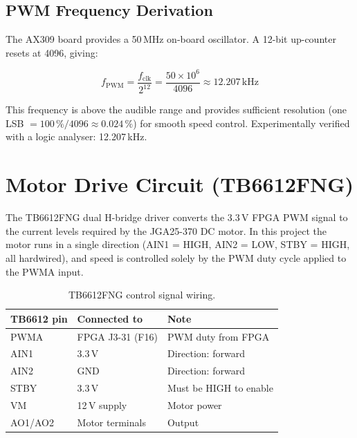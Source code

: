 \documentclass[12pt, a4paper]{report}
\begin{document}
\subsection{PWM Frequency Derivation}

The AX309 board provides a 50\,MHz on-board oscillator. A 12-bit up-counter
resets at 4096, giving:

\begin{equation}
    f_{\text{PWM}} = \frac{f_{\text{clk}}}{2^{12}} = \frac{50 \times 10^6}{4096}
    \approx 12.207\,\text{kHz}
    \label{eq:pwm_freq}
\end{equation}

This frequency is above the audible range and provides sufficient resolution
(one LSB $= 100\,\%/4096 \approx 0.024\,\%$) for smooth speed control.
Experimentally verified with a logic analyser: 12.207\,kHz.

\section{Motor Drive Circuit (TB6612FNG)}

The TB6612FNG dual H-bridge driver converts the 3.3\,V FPGA PWM signal to
the current levels required by the JGA25-370 DC motor. In this project the
motor runs in a single direction (AIN1 = HIGH, AIN2 = LOW, STBY = HIGH,
all hardwired), and speed is controlled solely by the PWM duty cycle applied
to the PWMA input.

\begin{table}[H]
    \centering
    \caption{TB6612FNG control signal wiring.}
    \label{tab:tb6612}
    \begin{tabular}{lll}
        \toprule
        \textbf{TB6612 pin} & \textbf{Connected to} & \textbf{Note} \\
        \midrule
        PWMA & FPGA J3-31 (F16) & PWM duty from FPGA \\
        AIN1 & 3.3\,V           & Direction: forward \\
        AIN2 & GND              & Direction: forward \\
        STBY & 3.3\,V           & Must be HIGH to enable \\
        VM   & 12\,V supply     & Motor power \\
        AO1/AO2 & Motor terminals & Output \\
        \bottomrule
    \end{tabular}
\end{table}
\end{document}
